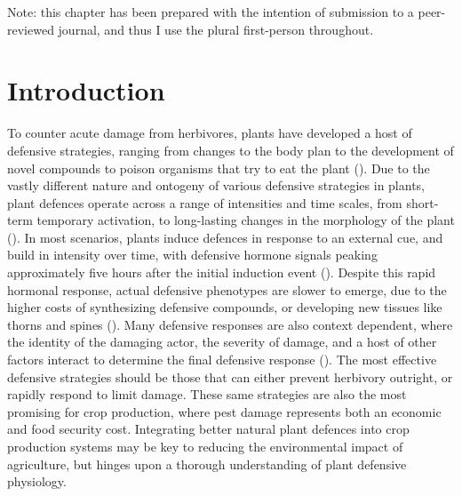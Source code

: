 \documentclass[12pt, letterpaper, ]{report}
\begin{document}
Note: this chapter has been prepared with the intention of submission to a peer-reviewed journal, and thus I use the plural first-person throughout.

\section{Introduction}

To counter acute damage from herbivores, plants have developed a host of defensive strategies, ranging from changes to the body plan to the development of novel compounds to poison organisms that try to eat the plant (\cite{agrawal_plant_2006}). Due to the vastly different nature and ontogeny of various defensive strategies in plants, plant defences operate across a range of intensities and time scales, from short-term temporary activation, to long-lasting changes in the morphology of the plant (\cite{agrawal_plant_2006, karban_induced_1989}). In most scenarios, plants induce defences in response to an external cue, and build in intensity over time, with defensive hormone signals peaking approximately five hours after the initial induction event (\cite{schmelz_quantitative_2003}). Despite this rapid hormonal response, actual defensive phenotypes are slower to emerge, due to the higher costs of synthesizing defensive compounds, or developing new tissues like thorns and spines (\cite{karban_induced_1989}). Many defensive responses are also context dependent, where the identity of the damaging actor, the severity of damage, and a host of other factors interact to determine the final defensive response (\cite{waterman_simulated_2019}). The most effective defensive strategies should be those that can either prevent herbivory outright, or rapidly respond to limit damage. These same strategies are also the most promising for crop production, where pest damage represents both an economic and food security cost. Integrating better natural plant defences into crop production systems may be key to reducing the environmental impact of agriculture, but hinges upon a thorough understanding of plant defensive physiology.
\end{document}
